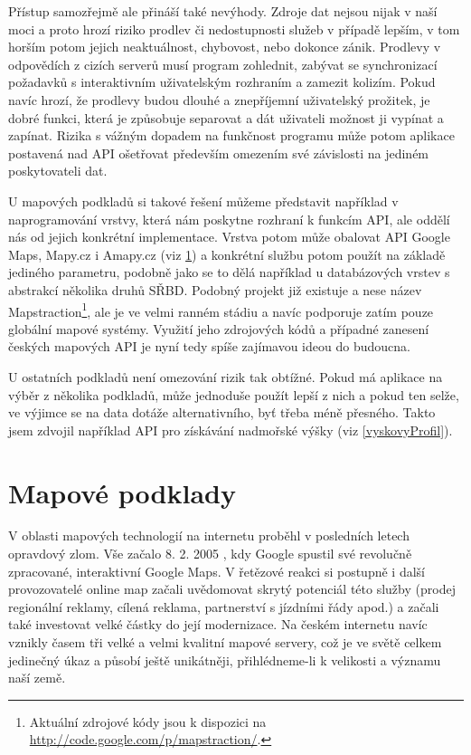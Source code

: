 Přístup samozřejmě ale přináší také nevýhody. Zdroje dat nejsou nijak
v naší moci a proto hrozí riziko prodlev či nedostupnosti služeb v
případě lepším, v tom horším potom jejich neaktuálnost, chybovost, nebo
dokonce zánik. Prodlevy v odpovědích z cizích serverů musí program
zohlednit, zabývat se synchronizací požadavků s interaktivním
uživatelským rozhraním a zamezit kolizím. Pokud navíc hrozí, že 
prodlevy budou dlouhé a znepříjemní uživatelský prožitek, je dobré
funkci, která je způsobuje separovat a dát uživateli možnost ji
vypínat a zapínat. Rizika s vážným dopadem na funkčnost programu může
potom aplikace postavená nad API ošetřovat především omezením své
závislosti na jediném poskytovateli dat.

U mapových podkladů si takové řešení můžeme představit například v
naprogramování vrstvy, která nám poskytne rozhraní k funkcím API,
ale oddělí nás od jejich konkrétní implementace. Vrstva potom může
obalovat API Google Maps, Mapy.cz i Amapy.cz (viz \ref{vybermap}) a
konkrétní službu potom použít na základě jediného parametru, podobně
jako se to dělá například u databázových vrstev s abstrakcí
několika druhů SŘBD. Podobný projekt již existuje a nese název
Mapstraction\footnote{Aktuální zdrojové kódy jsou k dispozici na
\url{http://code.google.com/p/mapstraction/}.}, ale je ve velmi ranném stádiu a navíc podporuje zatím pouze globální
mapové systémy. Využití jeho zdrojových kódů a případné zanesení českých
mapových API je nyní tedy spíše zajímavou ideou do budoucna.

U ostatních podkladů není omezování rizik tak obtížné. Pokud má
aplikace na výběr z několika podkladů, může jednoduše použít lepší z
nich a pokud ten selže, ve výjimce se na data dotáže alternativního,
byť třeba méně přesného. Takto jsem zdvojil například API pro
získávání nadmořské výšky (viz \ref{vyskovyProfil}).

\section{Mapové podklady}\label{vybermap}
V oblasti mapových technologií na internetu proběhl v
posledních letech opravdový zlom. Vše začalo 8. 2.
2005 \cite{gmaps}, kdy Google spustil své revolučně zpracované,
interaktivní Google Maps. V řetězové reakci si postupně i další
provozovatelé online map začali uvědomovat skrytý potenciál této
služby (prodej regionální reklamy, cílená reklama, partnerství s
jízdními řády apod.) a začali také investovat velké částky do její
modernizace. Na českém internetu navíc vznikly časem tři velké a
velmi kvalitní mapové servery, což je ve světě celkem jedinečný úkaz
a působí ještě unikátněji, přihlédneme-li k velikosti a významu naší
země.

